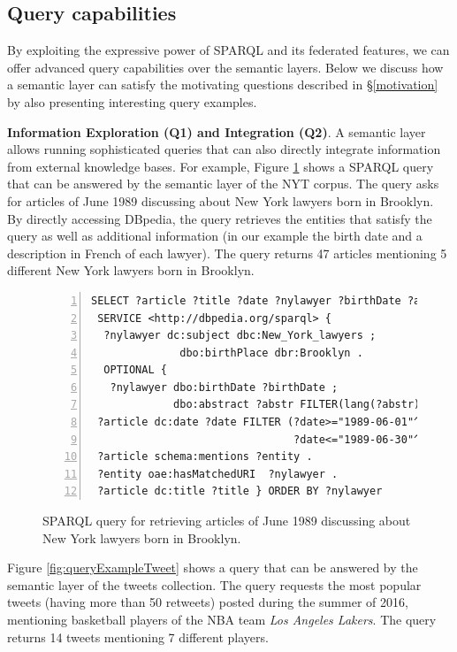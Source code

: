 \documentclass{libtex/sig-alternate-05-2015}
\begin{document}
\subsection{Query capabilities}
\label{queryCapabilities}
By exploiting the expressive power of SPARQL and its federated features,
we can offer advanced query capabilities over
the semantic layers.
Below we discuss how a semantic layer can satisfy the motivating questions
described in \S \ref{motivation} by also presenting interesting
query examples.

\vspace{1mm} \noindent
{\bf Information Exploration (Q1) and Integration (Q2)}.
A semantic layer allows running sophisticated que\-ries
that can also directly integrate information from external knowledge bases.
For example, Figure \ref{fig:queryExampleIntegrate} shows a SPARQL query
that can be answered by the semantic layer of the NYT corpus.
The query asks for articles of June 1989
discussing about New York lawyers born in Brooklyn.
By directly accessing DBpedia, the query retrieves the
entities that satisfy the query
as well as additional information (in our example the birth date
and a description in French of each lawyer).
The query returns  47 articles mentioning 5 different
New York lawyers born in Brooklyn.

\begin{figure}[th]
\vspace{-2mm}
\centering \scriptsize
\begin{Verbatim}[frame=lines,numbers=left,numbersep=1pt]
SELECT ?article ?title ?date ?nylawyer ?birthDate ?abstr WHERE {
 SERVICE <http://dbpedia.org/sparql> {
  ?nylawyer dc:subject dbc:New_York_lawyers ;
              dbo:birthPlace dbr:Brooklyn .
  OPTIONAL {
   ?nylawyer dbo:birthDate ?birthDate ;
             dbo:abstract ?abstr FILTER(lang(?abstr)="fr") } }
 ?article dc:date ?date FILTER (?date>="1989-06-01"^^xsd:date &&
                                ?date<="1989-06-30"^^xsd:date)
 ?article schema:mentions ?entity .
 ?entity oae:hasMatchedURI  ?nylawyer .
 ?article dc:title ?title } ORDER BY ?nylawyer
\end{Verbatim}
\vspace{-6mm}
\caption{SPARQL query for retrieving articles of June 1989
discussing about New York lawyers born in Brooklyn.}
\label{fig:queryExampleIntegrate}
\vspace{-2mm}
\end{figure}

Figure \ref{fig:queryExampleTweet} shows a query that can be answered
by the semantic layer of the tweets collection.
The query requests the most popular tweets (having more than 50 retweets)
posted during the summer of 2016, mentioning
basketball players of the NBA team {\em Los Angeles Lakers}.
The query returns 14 tweets mentioning 7 different players.
\end{document}
